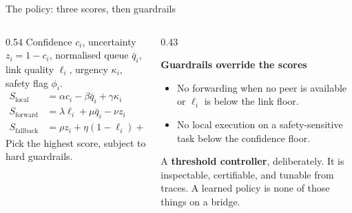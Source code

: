 \documentclass[aspectratio=169, 11pt]{beamer}
\newcommand{\shout}[1]{{\color{navy}\bfseries #1}}
\newcommand{\callout}[2][wash]{%
  \begin{beamercolorbox}[wd=\textwidth, sep=0.55em]{}%
  \colorbox{#1}{\parbox{\dimexpr\textwidth-1.2em\relax}{\vspace{0.15em}#2\vspace{0.15em}}}%
  \end{beamercolorbox}}
\begin{document}
\begin{frame}{The policy: three scores, then guardrails}

\vspace{0.2em}
\begin{columns}[T]
\begin{column}{0.54\textwidth}
  {\color{ink2}\small Confidence $c_i$, uncertainty $z_i = 1-c_i$, normalised queue $\bar q_i$, link quality $\ell_i$, urgency $\kappa_i$, safety flag $\phi_i$.}
  \vspace{0.5em}
  \begin{align*}
    S_{\text{local}}    &= \alpha c_i - \beta \bar q_i + \gamma \kappa_i \\[0.25em]
    S_{\text{forward}}  &= \lambda \ell_i + \mu \bar q_i - \nu z_i \\[0.25em]
    S_{\text{fallback}} &= \rho z_i + \eta (1-\ell_i) + \delta \phi_i
  \end{align*}
  \vspace{0.1em}
  {\color{ink2}\small Pick the highest score, subject to hard guardrails.}
\end{column}
\begin{column}{0.43\textwidth}
  \callout[wash]{\textbf{\color{navy}Guardrails override the scores}
  \begin{itemize}\setlength\itemsep{0.35em}\small
    \item No forwarding when no peer is available or $\ell_i$ is below the link floor.
    \item No local execution on a safety-sensitive task below the confidence floor.
  \end{itemize}}
  \vspace{0.7em}
  {\small A \shout{threshold controller}, deliberately. It is inspectable, certifiable, and tunable from traces. A learned policy is none of those things on a bridge.}
\end{column}
\end{columns}
\end{frame}
\end{document}
